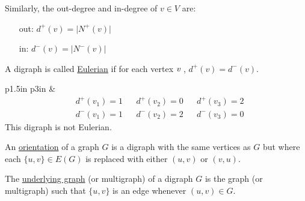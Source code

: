 \documentclass{book}
\newcommand{\exOne}{%
   \color{Purple}%
   \fontsize{14}{16}\selectfont%
}
\newenvironment{myIndent}{%
   \begin{adjustwidth}{2.5em}{0em}%
}{%
   \end{adjustwidth}%
}
\newcommand{\udefine}[1]{%
   \setulcolor{Red}%
   \setul{0.14em}{0.07em}%
   \ul{#1}%
}
\newcommand{\retTwo}{\hfill\bigbreak}
\begin{document}
Similarly, the out-degree and in-degree of $v \in V$ are:
\begin{myIndent}
   \begin{itemize}
      \item[{\color{BrickRed}out:}] $d^+(v)=\lvert N^+(v) \rvert$
      \item[{\color{BrickRed}\phantom{o}in:}] $d^-(v)=\lvert N^-(v) \rvert$
   \end{itemize}
\end{myIndent} \retTwo

A digraph is called \udefine{Eulerian} if for each vertex $v \hspace{0.25em}$, $d^+(v)=d^-(v)$.
{\center \exOne
   \begin{tabular}{ p{1.5in} p{3in} }
      &
      \[{\begin{matrix}
         & d^+(v_1) = 1 & & d^+(v_2) = 0 & & d^+(v_3) = 2 \\
         & d^-(v_1) = 1 & & d^-(v_2) = 2 & & d^-(v_3) = 0
      \end{matrix}}\]
      This digraph is not Eulerian.
   \end{tabular}
\par} \retTwo

An \udefine{orientation} of a graph $G$ is a digraph with the same vertices as $G$ but where each $\{u, v\} \in E(G)$ is replaced with either $(u, v)$ or $(v, u)$. \retTwo

The \udefine{underlying graph} (or multigraph) of a digraph $G$ is the graph (or multigraph) such that $\{u, v\}$ is an edge whenever $(u, v) \in G$.
\newpage
\end{document}
